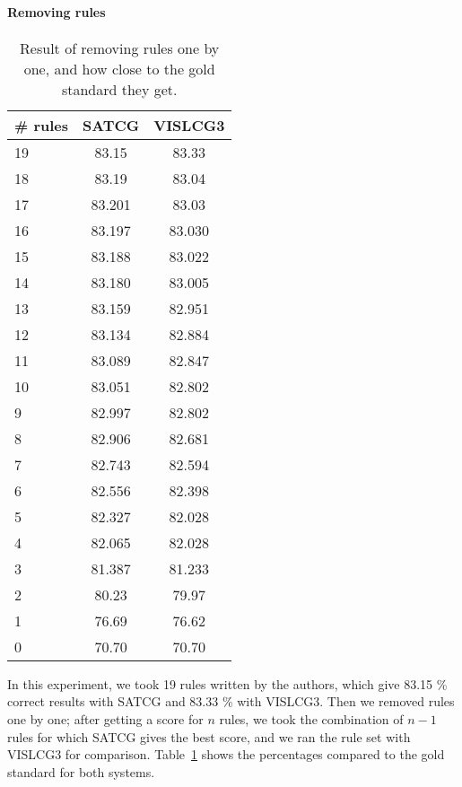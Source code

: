 \documentclass[11pt]{article}
\begin{document}
\paragraph{Removing rules}
\begin{table}
  \centering
  \begin{tabular}{|l|c|c|}
     \hline
    \textbf{\# rules} & \textbf{SATCG} & \textbf{VISLCG3} \\
    \hline 
	19 &  83.15 & 83.33 \\ \hline  %
	18 &  83.19 & 83.04 \\ \hline  %
	17 &  83.201 & 83.03 \\ \hline   %
	16 &  83.197 & 83.030 \\ \hline  %
	15 &  83.188 & 83.022\\ \hline  %
	14 &  83.180 & 83.005 \\ \hline  %
	13 &  83.159 & 82.951 \\ \hline  %
	12 &  83.134 & 82.884\\ \hline  %
	11 &  83.089 & 82.847\\ \hline  
	10 &  83.051 & 82.802\\ \hline  
	9  & 82.997 & 82.802 \\ \hline
	8  & 82.906 & 82.681 \\ \hline  %
	7  & 82.743 & 82.594 \\ \hline  %
	6  & 82.556 & 82.398\\ \hline  %
	5  & 82.327 & 82.028 \\ \hline %
	4  & 82.065 & 82.028 \\ \hline %
	3  & 81.387 & 81.233 \\ \hline %
	2  & 80.23 & 79.97 \\ \hline %
	1  & 76.69 & 76.62 \\ \hline 
	0  & 70.70 & 70.70 \\ \hline
  \end{tabular}
  \caption{Result of removing rules one by one, and how close to the gold standard they get.}
  \label{table:results_remove}
\end{table}
In this experiment, we took 19 rules written by the authors, which give 83.15 \% correct results with SATCG and 83.33 \% with VISLCG3.
Then we removed rules one by one; after getting a score for $n$ rules, we took the combination of $n-1$ rules for which SATCG gives the best score, and we ran the rule set with VISLCG3 for comparison. Table~\ref{table:results_remove} shows the percentages compared to the gold standard for both systems.







\end{document}
